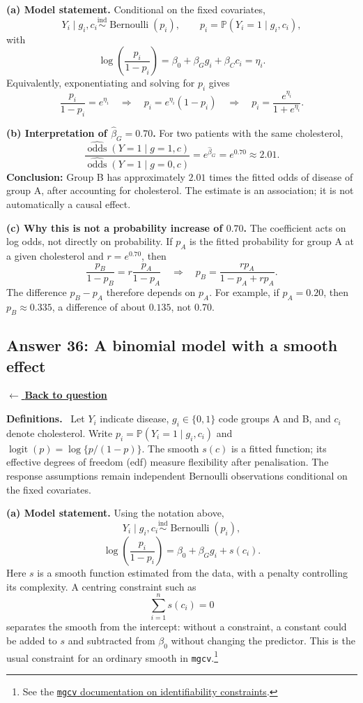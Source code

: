 \documentclass[11pt,a4paper]{article}
\newcommand{\given}{\mathrel{|}}
\newcommand{\answernav}[1]{%
  \label{answer:#1}%
  \noindent\hyperref[question:#1]{$\leftarrow$ \textbf{Back to question}}%
  \par\smallskip}
\newcommand{\studyheading}[1]{%
  \par\medskip\noindent\textcolor{statblue}{\textbf{#1.}}\ }
\begin{document}
\textbf{(a) Model statement.}
Conditional on the fixed covariates,
\[
Y_i\given g_i,c_i\overset{\mathrm{ind}}{\sim}
\operatorname{Bernoulli}(p_i),
\qquad p_i=\mathbb{P}(Y_i=1\given g_i,c_i),
\]
with
\[
\boxed{
\log\left(\frac{p_i}{1-p_i}\right)
=\beta_0+\beta_Gg_i+\beta_Cc_i=\eta_i.
}
\]
Equivalently, exponentiating and solving for $p_i$ gives
\[
\frac{p_i}{1-p_i}=e^{\eta_i}
\quad\Longrightarrow\quad
p_i=e^{\eta_i}(1-p_i)
\quad\Longrightarrow\quad
p_i=\frac{e^{\eta_i}}{1+e^{\eta_i}}.
\]

\textbf{(b) Interpretation of $\widehat\beta_G=0.70$.}
For two patients with the same cholesterol,
\[
\frac{\widehat{\operatorname{odds}}(Y=1\given g=1,c)}
     {\widehat{\operatorname{odds}}(Y=1\given g=0,c)}
=e^{\widehat\beta_G}=e^{0.70}\approx2.01.
\]
\textbf{Conclusion:} Group B has approximately $2.01$ times the fitted
odds of disease of group A, after accounting for cholesterol. The estimate
is an association; it is not automatically a causal effect.

\textbf{(c) Why this is not a probability increase of $0.70$.}
The coefficient acts on log odds, not directly on probability. If $p_A$
is the fitted probability for group A at a given cholesterol and
$r=e^{0.70}$, then
\[
\frac{p_B}{1-p_B}=r\frac{p_A}{1-p_A}
\quad\Longrightarrow\quad
\boxed{p_B=\frac{rp_A}{1-p_A+rp_A}.}
\]
The difference $p_B-p_A$ therefore depends on $p_A$. For example, if
$p_A=0.20$, then $p_B\approx0.335$, a difference of about $0.135$,
not $0.70$.

\clearpage

\subsection{Answer 36: A binomial model with a smooth effect}
\answernav{36}

\studyheading{Definitions}
Let $Y_i$ indicate disease, $g_i\in\{0,1\}$ code groups A and B, and $c_i$ denote cholesterol.
Write $p_i=\mathbb P(Y_i=1\given g_i,c_i)$ and $\operatorname{logit}(p)=\log\{p/(1-p)\}$.
The smooth $s(c)$ is a fitted function; its effective degrees of freedom (edf) measure flexibility after penalisation.
The response assumptions remain independent Bernoulli observations conditional on the fixed covariates.

\textbf{(a) Model statement.}
Using the notation above,
\[
Y_i\given g_i,c_i\overset{\mathrm{ind}}{\sim}
\operatorname{Bernoulli}(p_i),
\]
\[
\boxed{
\log\left(\frac{p_i}{1-p_i}\right)
=\beta_0+\beta_Gg_i+s(c_i).
}
\]
Here $s$ is a smooth function estimated from the data, with a penalty
controlling its complexity. A centring constraint such as
\[
\sum_{i=1}^n s(c_i)=0
\]
separates the smooth from the intercept: without a constraint, a constant
could be added to $s$ and subtracted from $\beta_0$ without changing the
predictor. This is the usual constraint for an ordinary smooth in
\texttt{mgcv}.\footnote{See the
\href{https://stat.ethz.ch/R-manual/R-devel/library/mgcv/html/identifiability.html}
{\texttt{mgcv} documentation on identifiability constraints}.}
\end{document}
